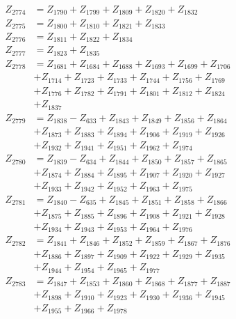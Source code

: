 \begin{multicols}{2}
\begin{align}
Z_{2774} &= Z_{1790} + Z_{1799} + Z_{1809} + Z_{1820} + Z_{1832} \nonumber \\
Z_{2775} &= Z_{1800} + Z_{1810} + Z_{1821} + Z_{1833} \nonumber \\
Z_{2776} &= Z_{1811} + Z_{1822} + Z_{1834} \nonumber \\
Z_{2777} &= Z_{1823} + Z_{1835} \nonumber \\
Z_{2778} &= Z_{1681} + Z_{1684} + Z_{1688} + Z_{1693} + Z_{1699} + Z_{1706}  \nonumber \\
&+ Z_{1714} + Z_{1723} + Z_{1733} + Z_{1744} + Z_{1756} + Z_{1769}  \nonumber \\
&+ Z_{1776} + Z_{1782} + Z_{1791} + Z_{1801} + Z_{1812} + Z_{1824}  \nonumber \\
&+ Z_{1837} \nonumber \\
Z_{2779} &= Z_{1838} - Z_{633} + Z_{1843} + Z_{1849} + Z_{1856} + Z_{1864}  \nonumber \\
&+ Z_{1873} + Z_{1883} + Z_{1894} + Z_{1906} + Z_{1919} + Z_{1926}  \nonumber \\
&+ Z_{1932} + Z_{1941} + Z_{1951} + Z_{1962} + Z_{1974} \nonumber \\
Z_{2780} &= Z_{1839} - Z_{634} + Z_{1844} + Z_{1850} + Z_{1857} + Z_{1865}  \nonumber \\
&+ Z_{1874} + Z_{1884} + Z_{1895} + Z_{1907} + Z_{1920} + Z_{1927}  \nonumber \\
&+ Z_{1933} + Z_{1942} + Z_{1952} + Z_{1963} + Z_{1975} \nonumber \\
Z_{2781} &= Z_{1840} - Z_{635} + Z_{1845} + Z_{1851} + Z_{1858} + Z_{1866}  \nonumber \\
&+ Z_{1875} + Z_{1885} + Z_{1896} + Z_{1908} + Z_{1921} + Z_{1928}  \nonumber \\
&+ Z_{1934} + Z_{1943} + Z_{1953} + Z_{1964} + Z_{1976} \nonumber \\
Z_{2782} &= Z_{1841} + Z_{1846} + Z_{1852} + Z_{1859} + Z_{1867} + Z_{1876}  \nonumber \\
&+ Z_{1886} + Z_{1897} + Z_{1909} + Z_{1922} + Z_{1929} + Z_{1935}  \nonumber \\
&+ Z_{1944} + Z_{1954} + Z_{1965} + Z_{1977} \nonumber \\
Z_{2783} &= Z_{1847} + Z_{1853} + Z_{1860} + Z_{1868} + Z_{1877} + Z_{1887}  \nonumber \\
&+ Z_{1898} + Z_{1910} + Z_{1923} + Z_{1930} + Z_{1936} + Z_{1945}  \nonumber \\
&+ Z_{1955} + Z_{1966} + Z_{1978} \nonumber \\

\end{align}
\end{multicols}
